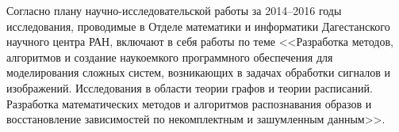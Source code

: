 \Introduction

Согласно плану научно-исследовательской работы за 2014--2016 годы исследования, проводимые в Отделе математики и информатики Дагестанского научного центра РАН, включают в себя работы по теме
<<Разработка методов, алгоритмов и создание наукоемкого программного обеспечения для моделирования сложных систем, возникающих в задачах обработки сигналов и изображений. Исследования в области теории графов и теории расписаний.
Разработка математических методов и алгоритмов распознавания образов и восстановление зависимостей по некомплектным и зашумленным данным>>.






